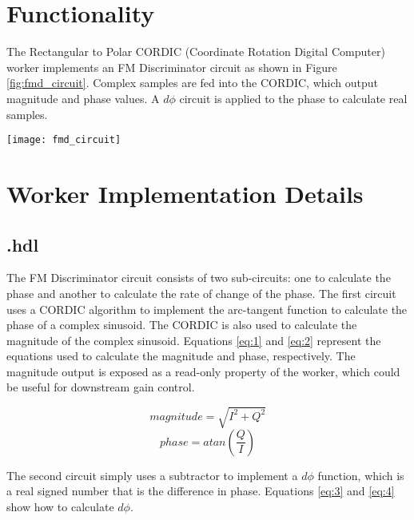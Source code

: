 \def\name{\comp}
\def\workertype{Application}
\def\version{\ocpiversion}
\def\releasedate{11/2019}
\def\componentlibrary{ocpi.assets.dsp\_{}comps}
\def\workers{\comp{}.hdl, \rcc_comp{}.rcc}
\def\testedplatforms{alst4, E310(PL), isim, Matchstiq-Z1(PL), ml605, modelsim, xsim, ZedBoard(PL)}


\section*{Functionality}
\begin{flushleft}
	The Rectangular to Polar CORDIC (Coordinate Rotation Digital Computer) worker implements an FM Discriminator circuit as shown in Figure \ref{fig:fmd_circuit}. Complex samples are fed into the CORDIC, which output magnitude and phase values. A $d\phi$ circuit is applied to the phase to calculate real samples.
\end{flushleft}
{\centering\captionsetup{type=figure}\texttt{[image: fmd\_circuit]}\par{}\label{fig:fmd_circuit}}

\section*{Worker Implementation Details}
\subsection*{\comp.hdl}
The FM Discriminator circuit consists of two sub-circuits: one to calculate the phase and another to calculate the rate of change of the phase. The first circuit uses a CORDIC algorithm to implement the arc-tangent function to calculate the phase of a complex sinusoid. The CORDIC is also used to calculate the magnitude of the complex sinusoid. Equations \ref{eq:1} and \ref{eq:2} represent the equations used to calculate the magnitude and phase, respectively. The magnitude output is exposed as a read-only property of the worker, which could be useful for downstream gain control.

\begin{equation} \label{eq:1}
	magnitude = \sqrt{I^2 + Q^2}
\end{equation}
\begin{equation} \label{eq:2}
	phase = atan(\frac{Q}{I})
\end{equation}

The second circuit simply uses a subtractor to implement a $d\phi$ function, which is a real signed number that is the difference in phase. Equations \ref{eq:3} and \ref{eq:4} show how to calculate $d\phi$.

